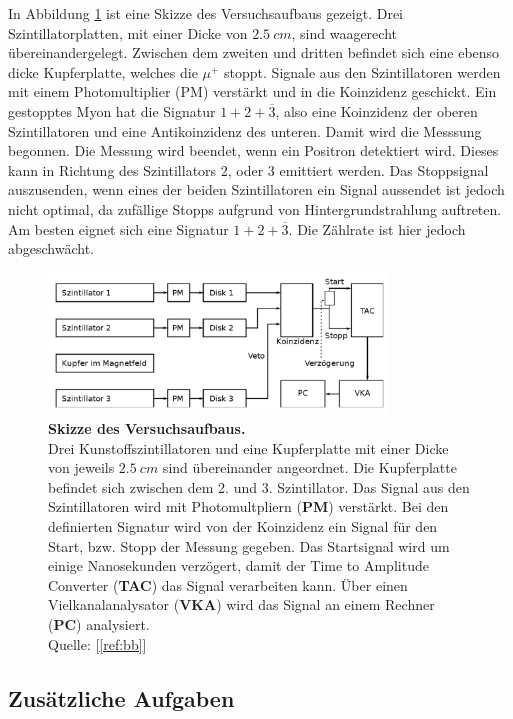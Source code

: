 \documentclass[a4paper,ngerman]{scrartcl}
\begin{document}
In Abbildung \ref{fig:aufbau_skizze} ist eine Skizze des Versuchsaufbaus gezeigt. Drei Szintillatorplatten, mit einer Dicke von $\SI{2.5}{cm}$, sind waagerecht übereinandergelegt. Zwischen dem zweiten und dritten befindet sich eine ebenso dicke Kupferplatte, welches die $\mu^{+}$ stoppt. 
Signale aus den Szintillatoren werden mit einem Photomultiplier (PM) verstärkt und in die Koinzidenz geschickt.
Ein gestopptes Myon hat die Signatur $1 + 2 + \overline{3}$, also eine Koinzidenz der oberen Szintillatoren und eine Antikoinzidenz des unteren. Damit wird die Messsung begonnen. Die Messung wird beendet, wenn ein Positron detektiert wird. Dieses kann in Richtung des Szintillators 2, oder 3 emittiert werden. Das Stoppsignal auszusenden, wenn eines der beiden Szintillatoren ein Signal aussendet ist jedoch nicht optimal, da zufällige Stopps aufgrund von Hintergrundstrahlung auftreten. Am besten eignet sich eine Signatur $1 + 2 + \overline{3}$. Die Zählrate ist hier jedoch abgeschwächt.  


\begin{figure}[tb!]
  \centering
  \includegraphics[width=0.8\textwidth]{abbildungen/aufbau_skizze.png}
  \caption{\textbf{Skizze des Versuchsaufbaus.} 
  \\ 
  Drei Kunstoffszintillatoren und eine Kupferplatte mit einer Dicke von jeweils $\SI{2.5}{cm}$ sind übereinander angeordnet. Die Kupferplatte befindet sich zwischen dem 2. und 3. Szintillator. Das Signal aus den Szintillatoren wird mit Photomultpliern (\textbf{PM}) verstärkt. Bei den definierten Signatur wird von der Koinzidenz ein Signal für den Start, bzw. Stopp der Messung gegeben. Das Startsignal wird um einige Nanosekunden verzögert, damit der Time to Amplitude Converter (\textbf{TAC}) das Signal verarbeiten kann. Über einen Vielkanalanalysator (\textbf{VKA}) wird das Signal an einem Rechner (\textbf{PC}) analysiert.
  \\Quelle: [\ref{ref:bb}]}
  \label{fig:aufbau_skizze}
\end{figure}


\subsection{Zusätzliche Aufgaben}
\end{document}
